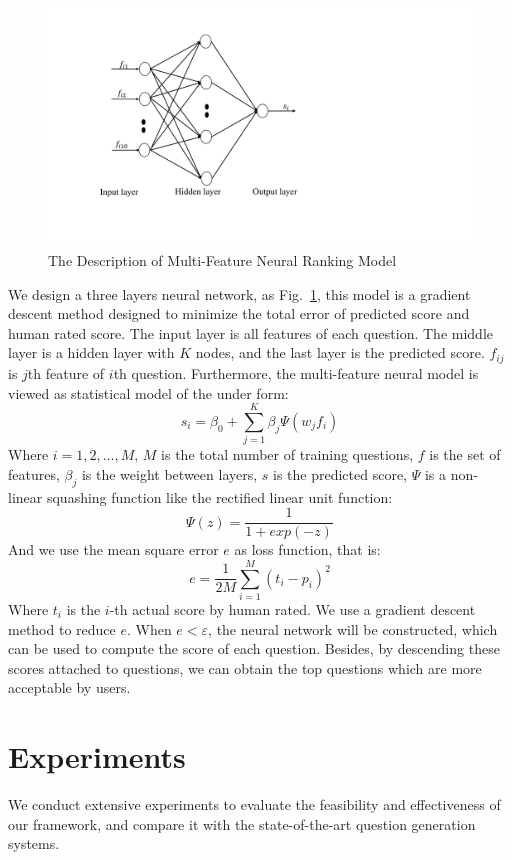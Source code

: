 \documentclass[runningheads,UTF8,article]{comsis2}
\begin{document}
	
	
	
	
	\begin{figure}[!ht]
		\centering
		\includegraphics[width=0.4\linewidth]{bp.pdf}
		\caption{The Description of Multi-Feature Neural Ranking Model}
		\label{bp}
	\end{figure}
	
	
	We design a three layers neural network, as Fig.~\ref{bp}, this model is a gradient descent method designed to minimize the total error of predicted score and human rated score.
	The input layer is all features of each question. The middle layer is a hidden layer with $K$ nodes, and the last layer is the predicted score. $f_{ij}$ is $j$th feature of $i$th question. Furthermore, the multi-feature neural model is viewed as statistical model of the under form:
	\begin{equation}
		s_i = \beta_0+\sum_{j=1}^{K}\beta_j\Psi(w_jf_i)
	\end{equation}
	Where $i=1,2,...,M$, $M $ is the total number of training questions, $f$ is the set of features, $ \beta_j $ is the weight between layers, $s$ is the predicted score, $ \Psi$ is a non-linear squashing function like the rectified linear unit function:
	\begin{equation}
		\Psi(z)= \frac{1}{1+exp(-z)}
	\end{equation}
	And we use the mean square error $ e $ as loss function, that is:
	\begin{equation}
		e = \frac{1}{2M}\sum_{i=1}^{M}(t_i-p_i)^2
	\end{equation}
	Where $ t_i $ is the $i$-th actual score by human rated. We use a gradient descent method to reduce $ e $. When $ e < \varepsilon$, the neural network will be constructed, which can be used to compute the score of each question. Besides, by descending these scores attached to questions, we can obtain the top questions which are more acceptable by users.
	
	
	
	\section{Experiments}
	We conduct extensive experiments to evaluate the feasibility and effectiveness of our framework, and compare it with the state-of-the-art question generation systems.
\end{document}
